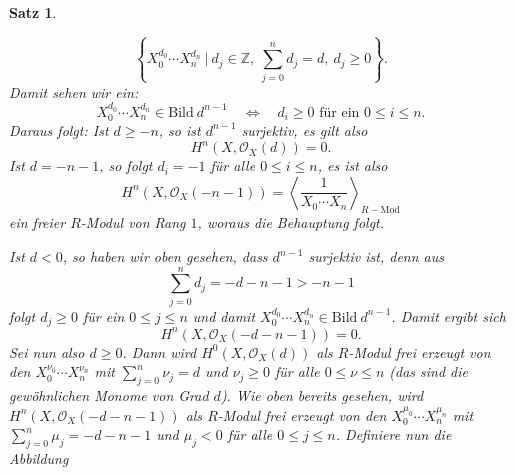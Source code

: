 \documentclass[11pt]{book}
\newtheorem{theorem}{Satz}[section]
\theoremstyle{nonumberbreak}
\newenvironment{pr}[1][]{\ifthenelse{\equal{#1}{}}{\proof}{\proof[#1]}\rm}{\endproof}
\newcommand{\bild}{\mathrm{Bild}\ }
\begin{document}
\begin{spacing}{1.4}
\begin{theorem}
\begin{pr}
\begin{compactenum}
$$\left\{ X_0^{d_0}\cdots X_n^{d_n} \ \bigg \vert \ d_j \in \mathbb{Z}, \ \sum_{j=0}^{n} d_j = d, \ d_j \geqslant 0 \right\}.$$
Damit sehen wir ein:
$$X_0^{d_0} \cdots X_n^{d_n} \in \bild d^{n-1} \quad \Longleftrightarrow \quad d_i \geqslant 0 \textrm{ für ein } 0 \leqslant i \leqslant n.$$
Daraus folgt: Ist $d \geqslant -n$, so ist $d^{n-1}$ surjektiv, es gilt also 
$$H^{n}(X, \mathcal{O}_X(d)) = 0.$$
Ist $d=-n-1$, so folgt $d_i=-1$ für alle $0 \leqslant i \leqslant n$, es ist also 
$$H^{n}(X, \mathcal{O}_X(-n-1)) = \left\langle \frac{1}{X_0 \cdots X_n} \right\rangle_{R-\mathrm{Mod}}$$
ein freier $R$-Modul von Rang $1$, woraus die Behauptung folgt.

\item Ist $d<0$, so haben wir oben gesehen, dass $d^{n-1}$ surjektiv ist, denn aus $$\sum_{j=0}^n d_j = -d -n-1 > -n-1$$ folgt $d_j \geqslant 0$ für ein $0 \leqslant j \leqslant n$ und damit $X_0^{d_0} \cdots X_n^{d_n} \in \bild d^{n-1}$. Damit ergibt sich 
$$H^{n}(X, \mathcal{O}_X(-d-n-1)) = 0.$$
Sei nun also $d \geqslant 0$. Dann wird $H^{0}(X, \mathcal{O}_X(d))$ als $R$-Modul frei erzeugt von den $X_0^{\nu_0} \cdots X_n^{\nu_n}$ mit $\sum_{j=0}^n \nu_j =d$ und $\nu_j \geqslant 0$ für alle $0 \leqslant \nu \leqslant n$ (das sind die gewöhnlichen Monome von Grad $d$). Wie oben bereits gesehen, wird $H^{n}(X, \mathcal{O}_X(-d-n-1))$ als $R$-Modul frei erzeugt von den $X_0^{\mu_0} \cdots X_n^{\mu_n}$ mit $\sum_{j=0}^n \mu_j = -d-n-1$ und $\mu_j <0$ für alle $0 \leqslant j \leqslant n$. Definiere nun die Abbildung 


\end{compactenum}
\end{pr}
\end{theorem}
\end{spacing}
\end{document}

